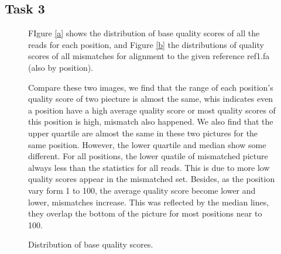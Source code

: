 \documentclass[a4paper]{article}
\begin{document}
\subsection{Task 3}
\begin{figure}[!htb]

	
FIgure \ref{a}  shows the distribution of base quality scores of all the reads for each position, and Figure \ref{b} the distributions of quality scores of all mismatches for alignment to the given reference ref1.fa  (also by position). 

Compare these two images, we find that the range of each position's quality score of two piecture is almost the same, whis indicates even a position have a high average quality score or most quality scores of this position is high, mismatch also happened. We also find that the upper quartile are almost the same in these two pictures for the same position. However, the lower quartile and median show some different. For all positions, the lower quatile of mismatched picture always less than the statistics for all reads. This is due to more low quality scores appear in the mismatched set.  
Besides, as the position vary form 1 to 100, the average quality score become lower and lower, mismatches increase. This was reflected by the median lines, they overlap the bottom of the picture for most positions near to 100.

	
	\centering
	\hspace{0.5in}
	\caption{Distribution of base quality scores.}
	\label{fig:2} 

	
\end{figure}
 


\end{document}
